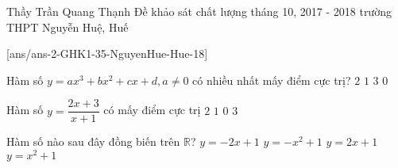 \begin{name}
{Thầy Trần Quang Thạnh}
{Đề khảo sát chất lượng tháng 10, 2017 - 2018 trường THPT Nguyễn Huệ, Huế}
\end{name}
\setcounter{ex}{0}
[ans/ans-2-GHK1-35-NguyenHue-Hue-18]
\begin{ex}%
	Hàm số $y=ax^3+bx^2+cx+d, a\neq 0$ có nhiều nhất mấy điểm cực trị?
\choice
{\True $2$}
{$1 $}
{$3 $}
{$0 $}

\end{ex}

\begin{ex}%
	Hàm số $y=\dfrac{2x+3}{x+1}$ có mấy điểm cực trị
	\choice
	{$2 $}
	{$1 $}
	{\True $0 $}
	{$3 $}
	
\end{ex}

\begin{ex}%
	Hàm số nào sau đây đồng biến trên $\mathbb{R}$?
	\choice
	{$y=-2x+1$}
	{$y=-x^2+1$}
	{\True $y=2x+1$}
	{$y=x^2+1$}
\end{ex}

